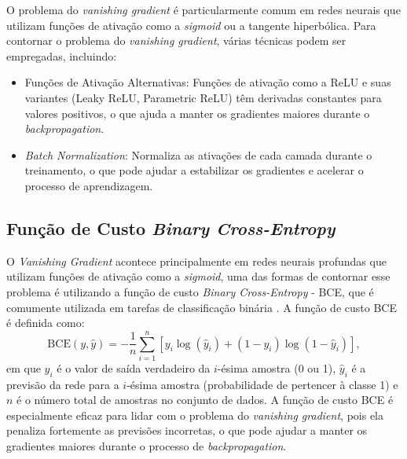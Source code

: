 O problema do \textit{vanishing gradient} é particularmente comum em redes neurais  que utilizam funções de ativação como a \textit{sigmoid} ou a tangente hiperbólica. Para contornar o problema do \textit{vanishing gradient}, várias técnicas podem ser empregadas, incluindo:
\begin{itemize}
    \item Funções de Ativação Alternativas: Funções de ativação como a ReLU e suas variantes (Leaky ReLU, Parametric ReLU) têm derivadas constantes para valores positivos, o que ajuda a manter os gradientes maiores durante o \textit{backpropagation}.
    \item \textit{Batch Normalization}: Normaliza as ativações de cada camada durante o treinamento, o que pode ajudar a estabilizar os gradientes e acelerar o processo de aprendizagem.
\end{itemize}

\subsection{Função de Custo \textit{Binary Cross-Entropy}}
\label{BCE}
O \textit{Vanishing Gradient} acontece principalmente em redes neurais profundas que utilizam funções de ativação como a \textit{sigmoid}, uma das formas de contornar esse problema é utilizando a função de custo \textit{Binary Cross-Entropy} - BCE, que é comumente utilizada em tarefas de classificação binária \cite{Elharrouss2025}. A função de custo BCE é definida como:
\begin{equation}
    \text{BCE}(y, \hat{y}) = -\frac{1}{n} \sum_{i=1}^{n} \left[ y_i \log(\hat{y}_i) + (1 - y_i) \log(1 - \hat{y}_i) \right],
\end{equation}
em que $y_i$ é o valor de saída verdadeiro da $i$-ésima amostra (0 ou 1), $\hat{y}_i$ é a previsão da rede para a $i$-ésima amostra (probabilidade de pertencer à classe 1) e $n$ é o número total de amostras no conjunto de dados. A função de custo BCE é especialmente eficaz para lidar com o problema do \textit{vanishing gradient}, pois ela penaliza fortemente as previsões incorretas, o que pode ajudar a manter os gradientes maiores durante o processo de \textit{backpropagation}. 

